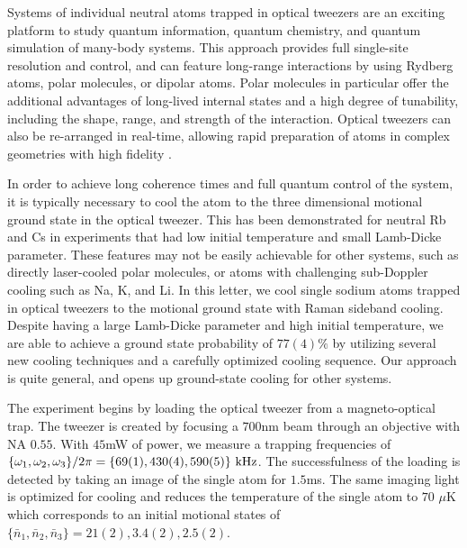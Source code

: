 \documentclass[aps,prl,twocolumn,groupedaddress]{revtex4-1}
\begin{document}
Systems of individual neutral atoms trapped in optical tweezers are an exciting platform to study
quantum information, quantum chemistry, and quantum simulation of many-body systems\cite{Schlosser2001,DeMille2002,Muller2014Rydberg}.
This approach provides full single-site resolution and control,
and can feature long-range interactions by using Rydberg atoms, polar molecules,
or dipolar atoms\cite{Micheli2006,Muller2014Rydberg,Walker2012}.
Polar molecules in particular offer the additional advantages of long-lived internal states
and a high degree of tunability, including the shape, range,
and strength of the interaction\cite{Sortais2007,Beugnon2007,Ni2009}.
Optical tweezers can also be re-arranged in real-time,
allowing rapid preparation of atoms in complex geometries with high fidelity
\cite{Carpentier2013,Weiss2004}.

In order to achieve long coherence times and full quantum control of the system,
it is typically necessary to cool the atom to the
three dimensional motional ground state in the optical tweezer.
This has been demonstrated for neutral Rb\cite{Thompson2013,Kaufman2012}
and Cs\cite{Li2012,Liu2017}
in experiments that had low initial temperature and small Lamb-Dicke parameter.
These features may not be easily achievable for other systems,
such as directly laser-cooled polar molecules\cite{Shuman2010,Chae2017},
or atoms with challenging sub-Doppler cooling such as Na, K, and Li\cite{Shahriar1993a,Colzi2016,Salomon2013,Salomon2015}.
In this letter, we cool single sodium atoms trapped in optical tweezers to
the motional ground state with Raman sideband cooling.
Despite having a large Lamb-Dicke parameter and high initial temperature,
we are able to achieve a ground state probability of $77(4)\%$
by utilizing several new cooling techniques and a carefully optimized cooling sequence.
Our approach is quite general, and opens up ground-state cooling for other systems.

The experiment begins by loading the optical tweezer from a magneto-optical trap.
The tweezer is created by focusing a $700$nm beam through an objective with NA $0.55$.
With $45$mW of power, we measure a trapping frequencies of
$\{\omega_1,\omega_2,\omega_3\}/2\pi = \{69(1), 430(4), 590(5)\}\ \text{\text{kHz}}$.
The successfulness of the loading is detected by taking an image of the single atom for $1.5$ms.
The same imaging light is optimized for cooling and reduces the temperature of the single atom
to $70$ $\mu$K which corresponds to an initial motional states of
$\{\bar n_1, \bar n_2, \bar n_3\}=21(2), 3.4(2), 2.5(2)$.
\end{document}
